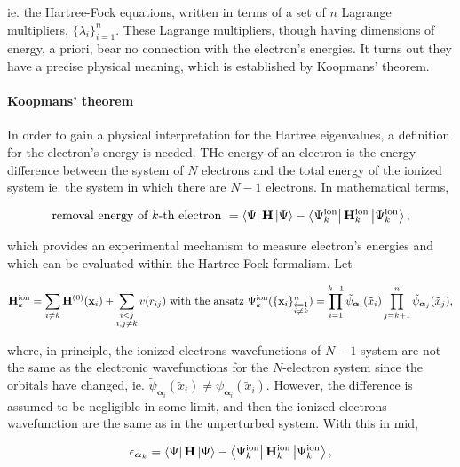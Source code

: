 \documentclass{homework}
\begin{document}
ie. the Hartree-Fock equations, written in terms of a set of $n$ Lagrange multipliers, $\{\lambda_i\}_{i=1}^{n}$. These Lagrange multipliers, though having dimensions of energy, a priori, bear no connection with the electron's energies. It turns out they have a precise physical meaning, which is established by Koopmans' theorem.

\paragraph{\textbf{Koopmans' theorem}}

In order to gain a physical interpretation for the Hartree eigenvalues, a definition for the electron's energy is needed. THe energy of an electron is the energy difference between the system of $N$ electrons and the total energy of the ionized system ie. the system in which there are $N-1$ electrons. In mathematical terms, 

$$
\textnormal{removal energy of } k\textnormal{-th electron } = \bra{\Psi} {{\bf H}} \ket{\Psi} - \bra{\Psi^{\textnormal{ion}}_k} {{\bf H}^{\textnormal{ion}}_k} \ket{\Psi^{\textnormal{ion}}_k},
$$

which provides an experimental mechanism to measure electron's energies and which can be evaluated within the Hartree-Fock formalism. Let 

\begin{align*}
    {{\bf H}^{\textnormal{ion}}_k} = \sum_{i \neq k} {\bf H}^{(0)}({\bf x}_i) + \sum_{\substack{i < j \\
                            i, j \neq k}} v(r_{ij}) \textnormal{ with the ansatz } \Psi^{\textnormal{ion}}_k(\{{\bf x}_i\}_{\substack{i = 1 \\
                            i \neq k}}^{n}) =  \prod_{i=1}^{k-1}\tilde{\psi}_{{\bm \alpha}_i} (\tilde{x}_i) \prod_{j=k+1}^{n} \tilde{\psi}_{{\bm \alpha}_j} (\tilde{x}_j),
\end{align*}

where, in principle, the ionized electrons wavefunctions of $N-1$-system are not the same as the electronic wavefunctions for the $N$-electron system since the orbitals have changed, ie. $\tilde{\psi}_{{\bm \alpha}_i} (\tilde{x}_i) \neq {\psi}_{{\bm \alpha}_i} (\tilde{x}_i)$. However, the difference is assumed to be negligible in some limit, and then the ionized electrons wavefunction are the same as in the unperturbed system. With this in mid, 

$$
\epsilon_{{\bm \alpha}_k}= \bra{\Psi} {{\bf H}} \ket{\Psi} - \bra{\Psi^{\textnormal{ion}}_k} {{\bf H}^{\textnormal{ion}}_k} \ket{\Psi^{\textnormal{ion}}_k},
$$
\end{document}
